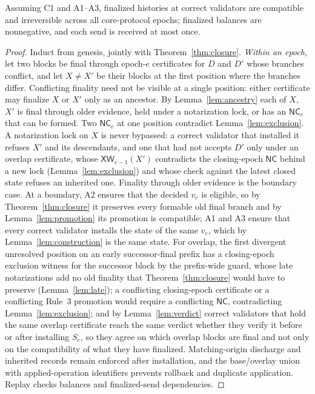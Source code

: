 \documentclass[conference]{IEEEtran}
\newcommand{\NC}{\mathsf{NC}}
\newcommand{\XW}{\mathsf{XW}}
\begin{document}
\begin{theorem}
\label{thm:safety}
Assuming C1 and A1--A3, finalized histories at correct validators are compatible and irreversible across all core-protocol epochs; finalized balances are nonnegative, and each send is received at most once.
\end{theorem}
\begin{proof}
Induct from genesis, jointly with Theorem~\ref{thm:closure}. \emph{Within an epoch}, let two blocks be final through epoch-$e$ certificates for $D$ and $D'$ whose branches conflict, and let $X\ne X'$ be their blocks at the first position where the branches differ. Conflicting finality need not be visible at a single position: either certificate may finalize $X$ or $X'$ only as an ancestor. By Lemma~\ref{lem:ancestry} each of $X$, $X'$ is final through older evidence, held under a notarization lock, or has an $\NC_e$ that can be formed. Two $\NC_e$ at one position contradict Lemma~\ref{lem:exclusion}. A notarization lock on $X$ is never bypassed: a correct validator that installed it refuses $X'$ and its descendants, and one that had not accepts $D'$ only under an overlap certificate, whose $\XW_{e-1}(X')$ contradicts the closing-epoch $\NC$ behind a new lock (Lemma~\ref{lem:exclusion}) and whose check against the latest closed state refuses an inherited one. Finality through older evidence is the boundary case. At a boundary, A2 ensures that the decided $v_e$ is eligible, so by Theorem~\ref{thm:closure} it preserves every formable old final branch and by Lemma~\ref{lem:promotion} its promotion is compatible; A1 and A3 ensure that every correct validator installs the state of the same $v_e$, which by Lemma~\ref{lem:construction} is the same state. For overlap, the first divergent unresolved position on an early successor-final prefix has a closing-epoch exclusion witness for the successor block by the prefix-wide guard, whose late notarizations add no old finality that Theorem~\ref{thm:closure} would have to preserve (Lemma~\ref{lem:late}); a conflicting closing-epoch certificate or a conflicting Rule~3 promotion would require a conflicting $\NC$, contradicting Lemma~\ref{lem:exclusion}; and by Lemma~\ref{lem:verdict} correct validators that hold the same overlap certificate reach the same verdict whether they verify it before or after installing $S_e$, so they agree on which overlap blocks are final and not only on the compatibility of what they have finalized. Matching-origin discharge and inherited records remain enforced after installation, and the base/overlay union with applied-operation identifiers prevents rollback and duplicate application. Replay checks balances and finalized-send dependencies.
\end{proof}
\end{document}
